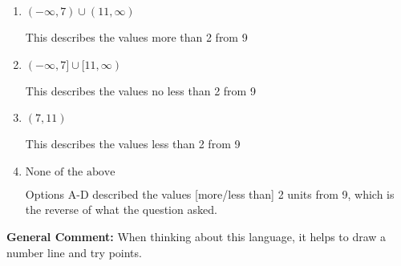 \documentclass{extbook}[14pt]
\begin{document}
\begin{enumerate}
{\begin{enumerate}[label=\Alph*.]
This describes the values no more than 2 from 9
\item \( (-\infty, 7) \cup (11, \infty) \)

This describes the values more than 2 from 9
\item \( (-\infty, 7] \cup [11, \infty) \)

This describes the values no less than 2 from 9
\item \( (7, 11) \)

This describes the values less than 2 from 9
\item \( \text{None of the above} \)

Options A-D described the values [more/less than] 2 units from 9, which is the reverse of what the question asked.
\end{enumerate}

\textbf{General Comment:} When thinking about this language, it helps to draw a number line and try points.
}
\end{enumerate}
\end{document}
